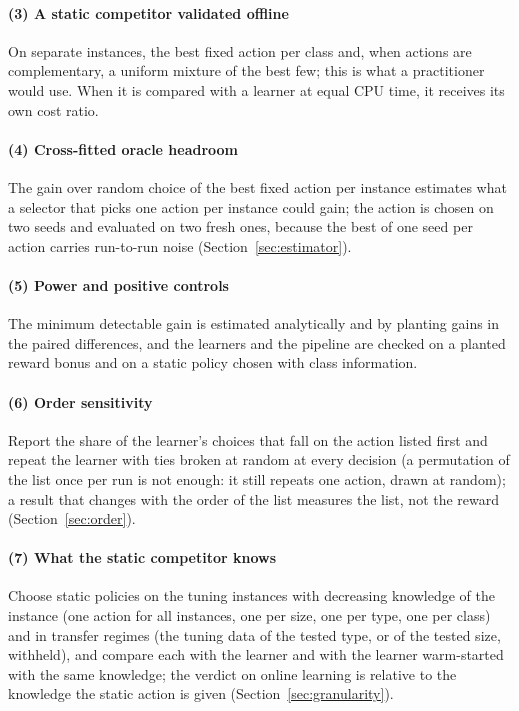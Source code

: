 \paragraph{(3) A static competitor validated offline} On separate instances, the best fixed action per class and, when actions are complementary, a uniform mixture of the best few; this is what a practitioner would use. When it is compared with a learner at equal CPU time, it receives its own cost ratio.

\paragraph{(4) Cross-fitted oracle headroom} The gain over random choice of the best fixed action per instance estimates what a selector that picks one action per instance could gain; the action is chosen on two seeds and evaluated on two fresh ones, because the best of one seed per action carries run-to-run noise (Section~\ref{sec:estimator}).

\paragraph{(5) Power and positive controls} The minimum detectable gain is estimated analytically and by planting gains in the paired differences, and the learners and the pipeline are checked on a planted reward bonus and on a static policy chosen with class information.

\paragraph{(6) Order sensitivity} Report the share of the learner's choices that fall on the action listed first and repeat the learner with ties broken at random at every decision (a permutation of the list once per run is not enough: it still repeats one action, drawn at random); a result that changes with the order of the list measures the list, not the reward (Section~\ref{sec:order}).

\paragraph{(7) What the static competitor knows} Choose static policies on the tuning instances with decreasing knowledge of the instance (one action for all instances, one per size, one per type, one per class) and in transfer regimes (the tuning data of the tested type, or of the tested size, withheld), and compare each with the learner and with the learner warm-started with the same knowledge; the verdict on online learning is relative to the knowledge the static action is given (Section~\ref{sec:granularity}).

